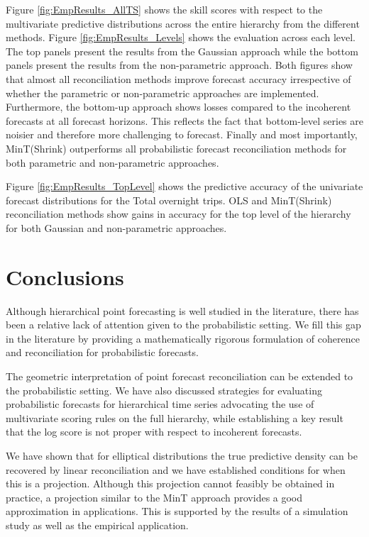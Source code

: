 \documentclass[12pt]{article}
\theoremstyle{definition}
\begin{document}
Figure \ref{fig:EmpResults_AllTS} shows the skill scores with respect to the multivariate predictive distributions across the entire hierarchy from the different methods. Figure \ref{fig:EmpResults_Levels} shows the evaluation across each level. The top panels present the results from the Gaussian approach while the bottom panels present the results from the non-parametric approach. Both figures show that almost all reconciliation methods improve forecast accuracy irrespective of whether the parametric or non-parametric approaches are implemented. Furthermore, the bottom-up approach shows losses compared to the incoherent forecasts at all forecast horizons. This reflects the fact that bottom-level series are noisier and therefore more challenging to forecast. Finally and most importantly, MinT(Shrink) outperforms all probabilistic forecast reconciliation methods for both parametric and non-parametric approaches.

Figure \ref{fig:EmpResults_TopLevel} shows the predictive accuracy of the univariate forecast distributions for the Total overnight trips. OLS and MinT(Shrink) reconciliation methods show gains in accuracy for the top level of the hierarchy for both Gaussian and non-parametric approaches.

\section{Conclusions}\label{sec:conclusion}

Although hierarchical point forecasting is well studied in the literature, there has been a relative lack of attention given to the probabilistic setting. We fill this gap in the literature by providing a mathematically rigorous formulation of coherence and reconciliation for probabilistic forecasts.

The geometric interpretation of point forecast reconciliation can be extended to the probabilistic setting. We have also discussed strategies for evaluating probabilistic forecasts for hierarchical time series advocating the use of multivariate scoring rules on the full hierarchy, while establishing a key result that the log score is not proper with respect to incoherent forecasts.

We have shown that for elliptical distributions the true predictive density can be recovered by linear reconciliation and we have established conditions for when this is a projection. Although this projection cannot feasibly be obtained in practice, a projection similar to the MinT approach provides a good approximation in applications. This is supported by the results of a simulation study as well as the empirical application.
\end{document}
